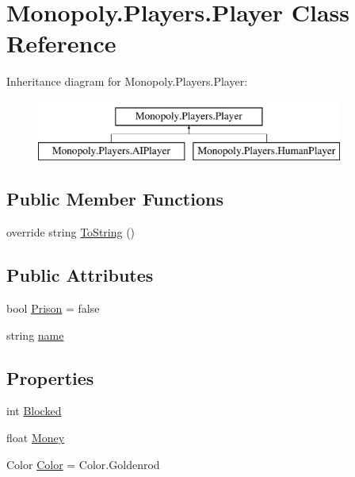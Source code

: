 \hypertarget{class_monopoly_1_1_players_1_1_player}{}\section{Monopoly.\+Players.\+Player Class Reference}
\label{class_monopoly_1_1_players_1_1_player}
Inheritance diagram for Monopoly.\+Players.\+Player\+:\begin{figure}[H]
\begin{center}
\leavevmode
\includegraphics[height=2.000000cm]{class_monopoly_1_1_players_1_1_player}
\end{center}
\end{figure}
\subsection*{Public Member Functions}
\begin{DoxyCompactItemize}
\item 
override string \mbox{\hyperlink{class_monopoly_1_1_players_1_1_player_a7f052d67464f27df644c9b2a903593ba}{To\+String}} ()
\end{DoxyCompactItemize}
\subsection*{Public Attributes}
\begin{DoxyCompactItemize}
\item 
bool \mbox{\hyperlink{class_monopoly_1_1_players_1_1_player_a308be52351bb6ad3e287e24f2fb04999}{Prison}} = false
\item 
string \mbox{\hyperlink{class_monopoly_1_1_players_1_1_player_a554b9887d583e93fc182fb5cf43a08c8}{name}}
\end{DoxyCompactItemize}
\subsection*{Properties}
\begin{DoxyCompactItemize}
\item 
int \mbox{\hyperlink{class_monopoly_1_1_players_1_1_player_a39ba7c2c1b8f5cdf4c61d3df9653d515}{Blocked}}
\item 
float \mbox{\hyperlink{class_monopoly_1_1_players_1_1_player_aff8ece033d1cf30de1f2afcfc20dff97}{Money}}
\item 
Color \mbox{\hyperlink{class_monopoly_1_1_players_1_1_player_afcfd5b9c28b6ba4ce1e60e2e3baf7e31}{Color}} = Color.\+Goldenrod
\end{DoxyCompactItemize}


